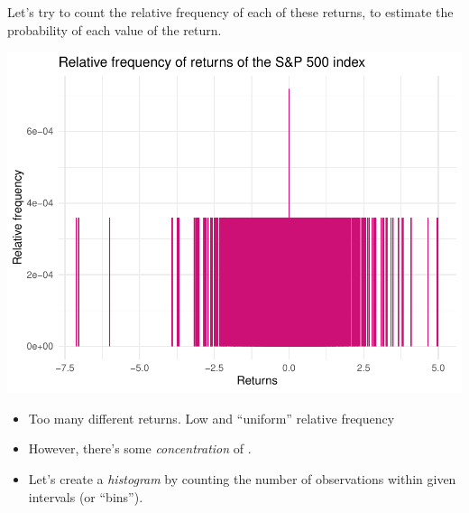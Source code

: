 \documentclass[notes=show,smaller,handout]{beamer}\usepackage[]{graphicx}\usepackage[]{color}
\newenvironment{knitrout}{}{} %
\begin{document}
\begin{frame}{\secname}
\begin{example}
  \begin{footnotesize}
  Let's try to count the relative frequency of each of these returns, to
  estimate the probability of each value of the return.
\begin{knitrout}
\color{fgcolor}

{\centering \includegraphics[width=0.5\linewidth]{figure/unnamed-chunk-3-1} 

}



\end{knitrout}
  \begin{itemize}
    \item Too many different returns. Low and ``uniform'' relative frequency
    \item However, there's some \emph{concentration} of .
    \item Let's create a \textit{histogram} by counting the number of observations within given intervals (or ``bins'').
  \end{itemize}
  \end{footnotesize}
  \end{example}
\end{frame}
\end{document}
